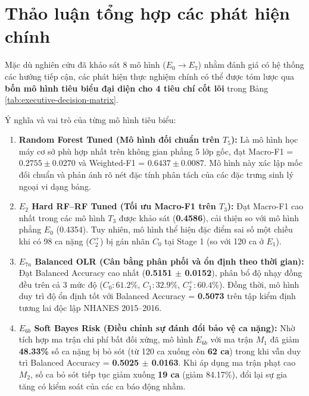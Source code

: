 \section{Thảo luận tổng hợp các phát hiện chính}
\label{sec:thao-luan-tong-hop}

Mặc dù nghiên cứu đã khảo sát 8 mô hình ($E_0 \to E_7$) nhằm đánh giá có hệ thống các hướng tiếp cận, các phát hiện thực nghiệm chính có thể được tóm lược qua \textbf{bốn mô hình tiêu biểu đại diện cho 4 tiêu chí cốt lõi} trong Bảng \ref{tab:executive-decision-matrix}.



Ý nghĩa và vai trò của từng mô hình tiêu biểu:
\begin{enumerate}
    \item \textbf{Random Forest Tuned (Mô hình đối chuẩn trên $T_5$):} Là mô hình học máy cơ sở phù hợp nhất trên không gian phẳng 5 lớp gốc, đạt Macro-F1 = $0.2755 \pm 0.0270$ và Weighted-F1 = $0.6437 \pm 0.0087$. Mô hình này xác lập mốc đối chuẩn và phản ánh rõ nét đặc tính phân tách của các đặc trưng sinh lý ngoại vi dạng bảng.
    \item \textbf{$E_2$ Hard RF--RF Tuned (Tối ưu Macro-F1 trên $T_3$):} Đạt Macro-F1 cao nhất trong các mô hình $T_3$ được khảo sát (\textbf{0.4586}), cải thiện so với mô hình phẳng $E_0$ (0.4354). Tuy nhiên, mô hình thể hiện đặc điểm sai số một chiều khi có 98 ca nặng ($C_2^+$) bị gán nhãn $C_0$ tại Stage 1 (so với 120 ca ở $E_1$).
    \item \textbf{$E_{7a}$ Balanced OLR (Cân bằng phân phối và ổn định theo thời gian):} Đạt Balanced Accuracy cao nhất (\textbf{0.5151 $\pm$ 0.0152}), phân bổ độ nhạy đồng đều trên cả 3 mức độ ($C_0: 61.2\%$, $C_1: 32.9\%$, $C_2^+: 60.4\%$). Đồng thời, mô hình duy trì độ ổn định tốt với Balanced Accuracy = \textbf{0.5073} trên tập kiểm định tương lai độc lập NHANES 2015--2016.
    \item \textbf{$E_{6b}$ Soft Bayes Risk (Điều chỉnh sự đánh đổi bảo vệ ca nặng):} Nhờ tích hợp ma trận chi phí bất đối xứng, mô hình $E_{6b}$ với ma trận $M_1$ đã giảm \textbf{48.33\%} số ca nặng bị bỏ sót (từ 120 ca xuống còn \textbf{62 ca}) trong khi vẫn duy trì Balanced Accuracy = \textbf{0.5025 $\pm$ 0.0163}. Khi áp dụng ma trận phạt cao $M_2$, số ca bỏ sót tiếp tục giảm xuống \textbf{19 ca} (giảm 84.17\%), đổi lại sự gia tăng có kiểm soát của các ca báo động nhầm.
\end{enumerate}

